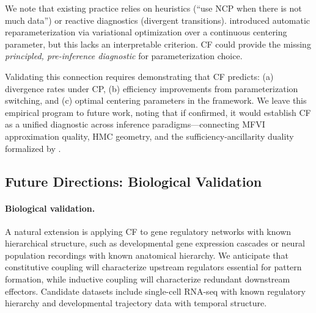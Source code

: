 \documentclass[10pt]{article} %
\theoremstyle{plain}
\theoremstyle{definition}
\begin{document}
We note that existing practice relies on heuristics (``use NCP when there is not much data'') or reactive diagnostics (divergent transitions). \citet{gorinova2020automatic} introduced automatic reparameterization via variational optimization over a continuous centering parameter, but this lacks an interpretable criterion. CF could provide the missing \emph{principled, pre-inference diagnostic} for parameterization choice.

Validating this connection requires demonstrating that CF predicts: (a) divergence rates under CP, (b) efficiency improvements from parameterization switching, and (c) optimal centering parameters in the \citet{gorinova2020automatic} framework. We leave this empirical program to future work, noting that if confirmed, it would establish CF as a unified diagnostic across inference paradigms---connecting MFVI approximation quality, HMC geometry, and the sufficiency-ancillarity duality formalized by \citet{yu2011center}.

\subsection{Future Directions: Biological Validation}

\paragraph{Biological validation.} A natural extension is applying CF to gene regulatory networks with known hierarchical structure, such as developmental gene expression cascades or neural population recordings with known anatomical hierarchy. We anticipate that constitutive coupling will characterize upstream regulators essential for pattern formation, while inductive coupling will characterize redundant downstream effectors. Candidate datasets include single-cell RNA-seq with known regulatory hierarchy and developmental trajectory data with temporal structure.
\end{document}
